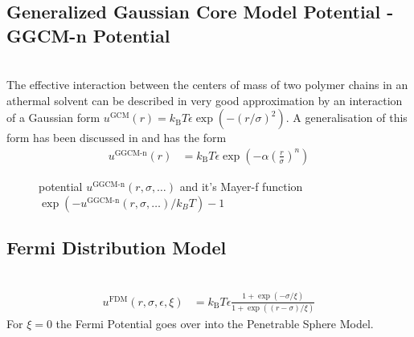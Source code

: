 \subsection{Generalized Gaussian Core Model Potential - GGCM-n Potential}
~\\

The effective interaction between the centers of mass of two polymer chains
in an athermal solvent can be described in very good approximation
by an interaction of a Gaussian form
$u^\text{GCM}(r)= k_\text{B} T \epsilon \exp\left(-\left(r/\sigma\right)^2\right)$.
A generalisation of this form has been discussed in \cite{Mladek2005,Louis2000} and
has the form
\begin{align}
u^\text{GGCM-n}(r)&=
k_\text{B} T \epsilon \exp\left(-\alpha\left(\frac{r}{\sigma}\right)^n\right)
\end{align}

\begin{figure}[htb]
\centering
  \quad
  \caption{potential $u^\text{GGCM-n}(r,\sigma,\ldots)$ and it's Mayer-f function $\exp(-u^\text{GGCM-n}(r,\sigma,\ldots)/k_BT)-1$}
\end{figure}


\newpage
\subsection{Fermi Distribution Model}
~\\
\begin{align}
u^\text{FDM}(r,\sigma,\epsilon,\xi) &=
k_\text{B} T \epsilon
\frac{1+\exp\left(-\sigma/\xi\right)}{1+\exp\left(\left(r-\sigma\right)/\xi\right)}
\end{align}
For $\xi = 0$ the Fermi Potential goes over into the Penetrable Sphere Model.

